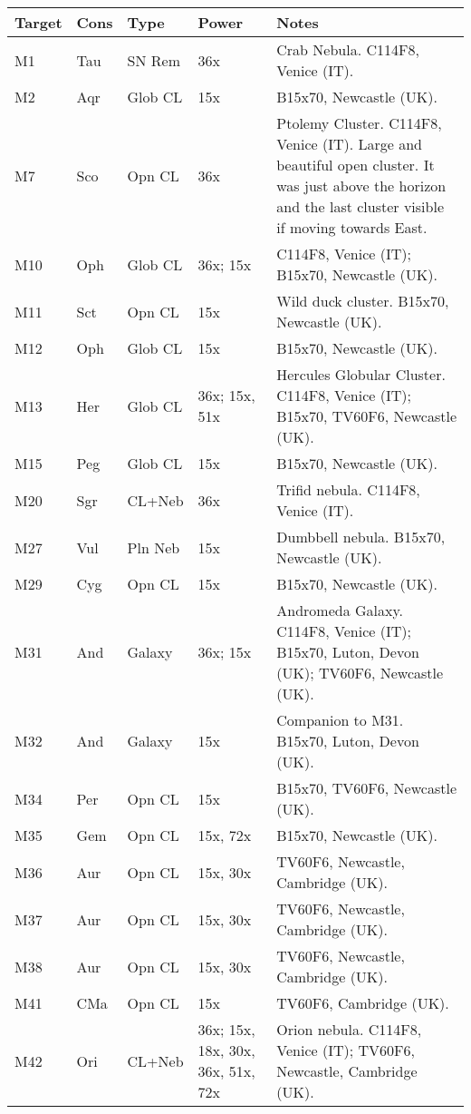 \begin{longtable}{ p{0.7in}  p{0.3in}  p{0.6in}  p{0.9in}  p{5.8in} }
\hline 
{\bf Target} & {\bf Cons} & {\bf Type} & {\bf Power} & {\bf Notes} \\ 
\hline 
M1 & Tau & SN Rem & 36x & Crab Nebula. C114F8, Venice (IT). \\ 
M2 & Aqr & Glob CL & 15x & B15x70, Newcastle (UK). \\ 
M7 & Sco & Opn CL & 36x & Ptolemy Cluster. C114F8, Venice (IT). Large and beautiful open cluster. It was just above the horizon and the last cluster visible if moving towards East. \\ 
M10 & Oph & Glob CL & 36x; 15x & C114F8, Venice (IT); B15x70, Newcastle (UK). \\ 
M11 & Sct & Opn CL & 15x & Wild duck cluster. B15x70, Newcastle (UK). \\ 
M12 & Oph & Glob CL & 15x & B15x70, Newcastle (UK). \\ 
M13 & Her & Glob CL & 36x; 15x, 51x & Hercules Globular Cluster. C114F8, Venice (IT); B15x70, TV60F6, Newcastle (UK). \\ 
M15 & Peg & Glob CL & 15x & B15x70, Newcastle (UK). \\ 
M20 & Sgr & CL+Neb & 36x & Trifid nebula. C114F8, Venice (IT). \\ 
M27 & Vul & Pln Neb & 15x & Dumbbell nebula. B15x70, Newcastle (UK). \\ 
M29 & Cyg & Opn CL & 15x & B15x70, Newcastle (UK). \\ 
M31 & And & Galaxy & 36x; 15x & Andromeda Galaxy. C114F8, Venice (IT); B15x70, Luton, Devon (UK); TV60F6, Newcastle (UK). \\ 
M32 & And & Galaxy & 15x & Companion to M31. B15x70, Luton, Devon (UK). \\ 
M34 & Per & Opn CL & 15x & B15x70, TV60F6, Newcastle (UK). \\ 
M35 & Gem & Opn CL & 15x, 72x & B15x70, Newcastle (UK). \\ 
M36 & Aur & Opn CL & 15x, 30x & TV60F6, Newcastle, Cambridge (UK). \\ 
M37 & Aur & Opn CL & 15x, 30x & TV60F6, Newcastle, Cambridge (UK). \\ 
M38 & Aur & Opn CL & 15x, 30x & TV60F6, Newcastle, Cambridge (UK). \\ 
M41 & CMa & Opn CL & 15x & TV60F6, Cambridge (UK). \\ 
M42 & Ori & CL+Neb & 36x; 15x, 18x, 30x, 36x, 51x, 72x & Orion nebula. C114F8, Venice (IT); TV60F6, Newcastle, Cambridge (UK). \\ 

\end{longtable}

